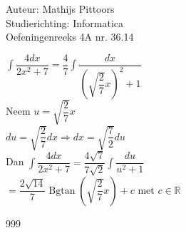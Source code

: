 \documentclass[a4paper]{article}
\newcommand{\intt}{\displaystyle\int}
\newcommand{\Bgtan}{\operatorname{Bgtan}}
\begin{document}
  
\noindent \large Auteur: Mathijs Pittoors \\
\noindent \large Studierichting: Informatica\\
\noindent \large Oefeningenreeks 4A nr. 36.14\\

\medskip

\normalsize

$\intt \dfrac{4dx}{2x^2+7} = \dfrac{4}{7} \intt \dfrac{dx}{\left(\sqrt{\dfrac{2}{7}} x\right)^2+1}$\\

Neem $u = \sqrt{\dfrac{2}{7}} x$\\

$du = \sqrt{\dfrac{2}{7}} dx \Rightarrow dx = \sqrt{\dfrac{7}{2}} du$\\

Dan $\intt \dfrac{4dx}{2x^2+7} = \dfrac{4 \sqrt{7}}{7 \sqrt{2}} \intt \dfrac{du}{u^2+1}$\\

$= \dfrac{2 \sqrt{14}}{7} \Bgtan \left( \sqrt{\dfrac{2}{7}}x \right) + c$ met $c \in \mathbb{R}$

\begin{thebibliography}{999}
\end{thebibliography}
\end{document}
